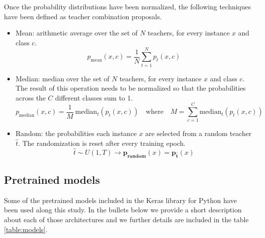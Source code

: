\documentclass{elsarticle}
\begin{document}
	 Once the probability distributions have been normalized, the following techniques have been defined as teacher combination proposals.
	 
	 \begin{itemize}
	 	\item Mean: arithmetic average over the set of $N$ teachers, for every instance $x$ and class $c$. 
	 	$$p_{\text{mean}}(x, c) = \frac{1}{N} \sum_{t=1}^N p_{t}(x, c)$$
	 	\item Median: median over the set of $N$ teachers, for every instance $x$ and class $c$. The result of this operation needs to be normalized so that the probabilities across the $C$ different classes sum to 1. $$p_{\text{median}}(x, c) = \frac{1}{M} \ \text{median}_t( p_{t}(x, c)) \quad \text{where} \quad M = \sum_{c=1}^C  \text{median}_t( p_{t}(x, c))$$
	 	\item Random: the probabilities each instance $x$ are selected from a random teacher $\hat{t}$. The randomization is reset after every training epoch. 
	 	$$\hat{t} \sim U(1, T) \rightarrow \mathbf{p_\text{random}}(x) = \mathbf{p_{\hat{t}}}(x)$$ 
 	\end{itemize}
 
    \subsection{Pretrained models}
    Some of the pretrained models included in the Keras library for Python \cite{chollet2015keras} have been used along this study. In the bullets below we provide a short description about each of those architectures and we further details are included in the table \ref{table:models}.
    
\end{document}

